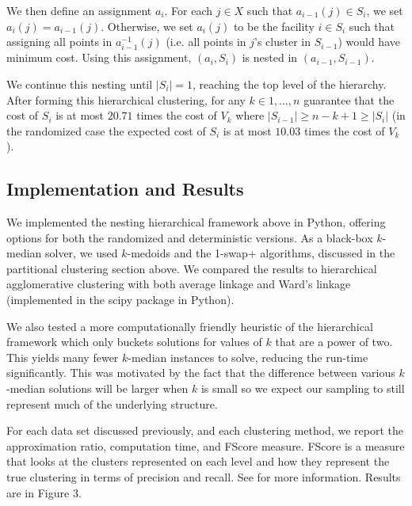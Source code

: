 \documentclass{article}
\begin{document}
We then define an assignment $a_i$. For each $j \in X$ such that $a_{i-1}(j) \in S_{i}$, we set $a_i(j) = a_{i-1}(j)$. Otherwise, we set $a_i(j)$ to be the facility $i \in S_i$ such that assigning all points in $a_{i-1}^{-1}(j)$ (i.e. all points in $j$'s cluster in $S_{i-1}$) would have minimum cost. Using this assignment, $(a_i, S_i)$ is nested in $(a_{i-1}, S_{i-1})$. 

We continue this nesting until $|S_i| = 1$, reaching the top level of the hierarchy. After forming this hierarchical clustering, for any $k \in 1, \ldots, n$ \cite{Lin} guarantee that the cost of $S_i$ is at most $20.71$ times the cost of $V_k$ where $|S_{i-1}| \geq n-k+1 \geq |S_{i}|$ (in the randomized case the expected cost of $S_i$ is at most $10.03$ times the cost of $V_k$).

\subsection{Implementation and Results}
We implemented the nesting hierarchical framework above in Python, offering options for both the randomized and deterministic versions. As a black-box $k$-median solver, we used $k$-medoids and the 1-swap+ algorithms, discussed in the partitional clustering section above. We compared the results to hierarchical agglomerative clustering with both average linkage and Ward's linkage (implemented in the scipy package in Python). 

We also tested a more computationally friendly heuristic of the hierarchical framework which only buckets solutions for values of $k$ that are a power of two. This yields many fewer $k$-median instances to solve, reducing the run-time significantly. This was motivated by the fact that the difference between various $k$-median solutions will be larger when $k$ is small so we expect our sampling to still represent much of the underlying structure. 
 
For each data set discussed previously, and each clustering method, we report the approximation ratio, computation time, and FScore measure.  FScore is a measure that looks at the clusters represented on each level and how they represent the true clustering in terms of precision and recall. See \cite{Larsen} for more information.  Results are in Figure 3.
\end{document}
